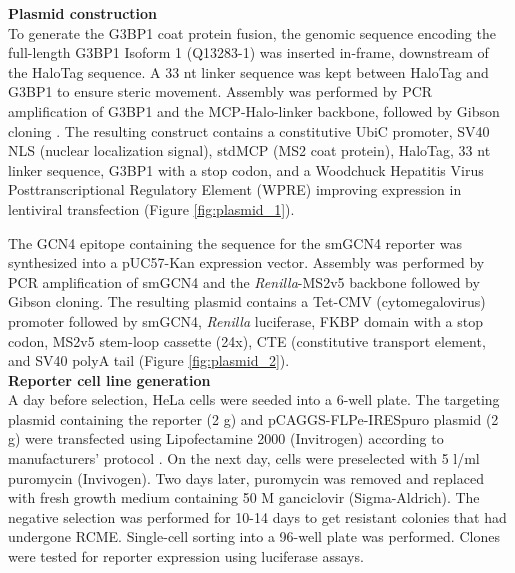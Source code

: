 \textbf{Plasmid construction} \\
To generate the G3BP1 coat protein fusion, the genomic sequence encoding the full-length G3BP1 Isoform 1 (Q13283-1) was inserted in-frame, downstream of the HaloTag sequence.
A 33 nt linker sequence was kept between HaloTag and G3BP1 to ensure steric movement.
Assembly was performed by PCR amplification of G3BP1 and the MCP-Halo-linker backbone, followed by Gibson cloning \cite{gibson_enzymatic_2009}.
The resulting construct contains a constitutive UbiC promoter, SV40 NLS (nuclear localization
    signal), stdMCP (MS2 coat protein), HaloTag, 33 nt linker sequence, G3BP1 with a stop codon,
    and a  Woodchuck Hepatitis Virus Posttranscriptional Regulatory Element (WPRE) improving
    expression in lentiviral transfection (Figure \ref{fig:plasmid_1}).

The GCN4 epitope containing the sequence for the smGCN4 reporter was synthesized into a pUC57-Kan expression vector.
Assembly was performed by PCR amplification of smGCN4 and the \textit{Renilla}-MS2v5 backbone followed by Gibson cloning.
The resulting plasmid contains a Tet-CMV (cytomegalovirus) promoter followed by smGCN4,
    \textit{Renilla} luciferase, FKBP domain with a stop codon, MS2v5 stem-loop cassette (24x),
    CTE (constitutive transport element, and SV40 polyA tail (Figure \ref{fig:plasmid_2}).
\\

\textbf{Reporter cell line generation} \\
A day before selection, HeLa cells were seeded into a 6-well plate.
The targeting plasmid containing the reporter (2 \textmu g) and pCAGGS-FLPe-IRESpuro plasmid (2 \textmu g) were transfected using Lipofectamine 2000 (Invitrogen) according to manufacturers’ protocol \cite{beard_efficient_2006}.
On the next day, cells were preselected with 5 \textmu l/ml puromycin (Invivogen). Two days later, puromycin was removed and replaced with fresh growth medium containing 50 \textmu M ganciclovir (Sigma-Aldrich).
The negative selection was performed for 10-14 days to get resistant colonies that had undergone RCME.
Single-cell sorting into a 96-well plate was performed.
Clones were tested for reporter expression using luciferase assays.
\\

